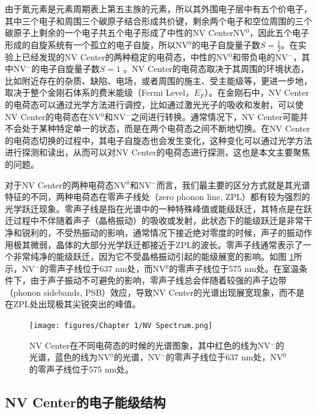 \documentclass[type = bachelor]{whu-thesis}
\begin{document}
由于氮元素是元素周期表上第五主族的元素，所以其外围电子层中有五个价电子，其中三个电子和周围三个碳原子结合形成共价键，剩余两个电子和空位周围的三个碳原子上剩余的一个电子共五个电子形成了中性的NV CenterNV$^0$，因此五个电子形成的自旋系统有一个孤立的电子自旋，所以NV$^0$的电子自旋量子数$S=\frac{1}{2}$。在实验上已经发现的NV Center的两种稳定的电荷态，中性的NV$^0$和带负电的NV$^-$，其中NV$^-$的电子自旋量子数$S=1$ \cite{waldherr2011dark,aslam2013photo,dolde2014nanoscale}。NV Center的电荷态取决于其周围的环境状态，比如附近存在的杂质、缺陷、电场，或者周围的施主、受主能级等，更进一步地，取决于整个金刚石体系的费米能级（Fermi Level，$E_F$）\cite{doherty2013nitrogen}。在金刚石中，NV Center的电荷态可以通过光学方法进行调控，比如通过激光光子的吸收和发射，可以使NV Center的电荷态在NV$^0$和NV$^-$之间进行转换\cite{doi2016pure,siyushev2013optically,shields2015efficient}。通常情况下，NV Center可能并不会处于某种特定单一的状态，而是在两个电荷态之间不断地切换。在NV Center的电荷态切换的过程中，其电子自旋态也会发生变化，这种变化可以通过光学方法进行探测和读出，从而可以对NV Center的电荷态进行探测，这也是本文主要聚焦的问题。

对于NV Center的两种电荷态NV$^0$和NV$^-$而言，我们最主要的区分方式就是其光谱特征的不同，两种电荷态在零声子线处（zero phonon line, ZPL）都有较为强烈的光学跃迁现象。零声子线是指在光谱中的一种特殊峰值或能级跃迁，其特点是在跃迁过程中不伴随着声子（晶格振动）的吸收或发射，此状态下的能级跃迁是非常干净和锐利的，不受热振动的影响，通常情况下接近绝对零度的时候，声子的振动作用极其微弱，晶体的大部分光学跃迁都接近于ZPL的波长。零声子线通常表示了一个非常纯净的能级跃迁，因为它不受晶格振动引起的能级展宽的影响。如图 \ref{fig: NV Spectrum}所示，NV$^-$的零声子线位于637 nm处，而NV$^0$的零声子线位于575 nm处。在室温条件下，由于声子振动不可避免的影响，零声子线总会伴随着较强的声子边带（phonon sidebands, PSB）效应，导致NV Center的光谱出现展宽现象，而不是在ZPL处出现极其尖锐突出的峰值。

\begin{figure}
  \centering
  \texttt{[image: figures/Chapter 1/NV Spectrum.png]}
  \caption[NV Center在不同电荷态的时候的光谱图象]{NV Center在不同电荷态的时候的光谱图象，其中红色的线为NV$^-$的光谱，蓝色的线为NV$^0$的光谱，NV$^-$的零声子线位于637 nm处，NV$^0$的零声子线位于575 nm处\cite{karaveli2016modulation}。}
  \label{fig: NV Spectrum}
\end{figure}

\subsection{NV Center的电子能级结构}
\end{document}
